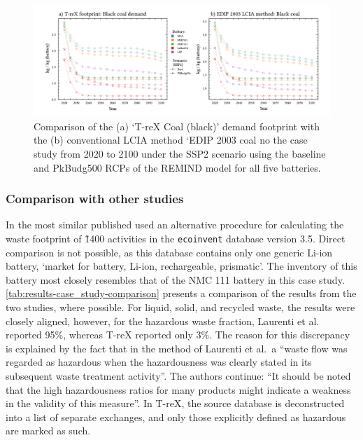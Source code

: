 \documentclass[a4paper,fleqn]{cas-dc}
\begin{document}
\protect\TLSdel{[htbp]}
\begin{figure}[!htbp]
	\centering
	
	\includegraphics[width=1.8\columnwidth]{figs/T-reX-coalANDedip.pdf}
	\caption{Comparison of the (a) `T-reX \protect\TLSdel{-} \protect{} Coal (black)' demand footprint with the (b) conventional LCIA method `EDIP 2003 \protect\TLSdel{-} \protect{} coal no \protect{} \protect{} the case study from 2020 to 2100 under the SSP2 scenario using the baseline and PkBudg500 RCPs of the REMIND model for all five batteries.}\label{fig:comparison_methods}
\end{figure}

\subsubsection{Comparison with other studies}\label{sec:results-case_study-comparison}

In the most similar published \protect{} \protect{} used an
alternative procedure for calculating the waste footprint of \~1400 activities
in the \texttt{ecoinvent} database version 3.5. Direct comparison is not
possible, as this database contains only one generic Li-ion battery, `market
for battery, Li-ion, rechargeable, prismatic'. The inventory of this battery
most closely resembles that of the NMC 111 battery in this case study.
\autoref{tab:results-case_study-comparison} presents a comparison of the
results from the two studies, where possible. For liquid, solid, and recycled
waste, the results were closely aligned, however, for the hazardous waste
fraction, Laurenti et al. reported 95\%, whereas T-reX reported only 3\%. The
reason for this discrepancy is explained by the fact that in the method of
Laurenti et al.\, a ``waste flow was regarded as hazardous when the
hazardousness was clearly stated in its subsequent waste treatment activity''.
The authors continue: ``It should be noted that the high hazardousness ratios
for many products might indicate a weakness in the validity of this measure''.
In T-reX, the source database is deconstructed into a list of separate
exchanges, and only those explicitly defined as hazardous are marked as such.
\end{document}
